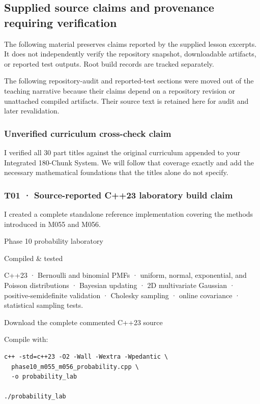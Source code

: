 \subsection{Supplied source claims and provenance requiring verification}\label{02-foundations-ii-ch039-supplied-source-claims-and-provenance-requiring-verification}

The following material preserves claims reported by the supplied lesson excerpts. It does not independently verify the repository snapshot, downloadable artifacts, or reported test outputs. Root build records are tracked separately.

The following repository-audit and reported-test sections were moved out of the teaching narrative because their claims depend on a repository revision or unattached compiled artifacts. Their source text is retained here for audit and later revalidation.

\subsubsection{Unverified curriculum cross-check claim}\label{02-foundations-ii-ch039-unverified-curriculum-cross-check-claim}

I verified all 30 part titles against the original curriculum appended to your Integrated 180-Chunk System. We will follow that coverage exactly and add the necessary mathematical foundations that the titles alone do not specify.

\subsubsection{T01 · Source-reported C++23 laboratory build claim}\label{02-foundations-ii-ch039-t01-source-reported-c23-laboratory-build-claim}

I created a complete standalone reference implementation covering the methods introduced in M055 and M056.

Phase 10 probability laboratory

Compiled \& tested

C++23 · Bernoulli and binomial PMFs · uniform, normal, exponential, and Poisson distributions · Bayesian updating · 2D multivariate Gaussian · positive-semidefinite validation · Cholesky sampling · online covariance · statistical sampling tests.

Download the complete commented C++23 source

Compile with:

\begin{verbatim}
c++ -std=c++23 -O2 -Wall -Wextra -Wpedantic \
  phase10_m055_m056_probability.cpp \
  -o probability_lab

./probability_lab
\end{verbatim}

